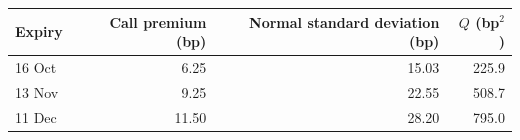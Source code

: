 \begin{tabular}{lrrr}\toprule Expiry & Call premium (bp) & Normal standard deviation (bp) & $Q$ (bp$^2$)\\\midrule
16 Oct & 6.25 & 15.03 & 225.9 \\
13 Nov & 9.25 & 22.55 & 508.7 \\
11 Dec & 11.50 & 28.20 & 795.0 \\
\bottomrule\end{tabular}
